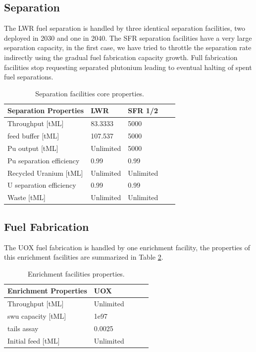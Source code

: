 \documentclass[12pt]{article}
\begin{document}
\subsection{Separation}

The LWR fuel separation is handled by three identical separation facilities,
two deployed in 2030 and one in 2040. The SFR separation facilities have a
very large separation capacity, in the first case, we have tried to throttle
the separation rate indirectly using the gradual fuel fabrication capacity
growth. Full fabrication facilities stop requesting separated plutonium
leading to eventual halting of spent fuel separations.

\begin{table}[h!]
    \centering
    \begin{tabular}{lllll}
    \hline
    Separation Properties	&	LWR		&	SFR 1/2	\\
    \hline
    Throughput [tML]		&	83.3333	&	5000		\\
    feed buffer [tML]		&	107.537	&	5000		\\
    Pu output  [tML]		&	Unlimited	&	5000		\\
    Pu separation efficiency	&	0.99		&	0.99		\\
    Recycled Uranium [tML]	&	Unlimited	&	Unlimited	\\
    U separation efficiency	&	0.99		&	0.99		\\
    Waste [tML]			&	Unlimited	&	Unlimited	\\
    \hline
    \end{tabular}
    \caption{Separation facilities core properties. }
    \label{tab:separation_1}
\end{table}

\subsection{Fuel Fabrication}

The UOX fuel fabrication is handled by one enrichment facility, the properties
of this enrichment facilities are summarized in Table \ref{tab:enrich_1}.

\begin{table}[h!]
    \centering
    \begin{tabular}{lllll}
    \hline
    Enrichment Properties	&	UOX		\\
    \hline
    Throughput [tML]		&	Unlimited	\\
    swu capacity [tML]		&	1e97		\\
    tails assay  			&	0.0025	\\
    Initial feed [tML]		&	Unlimited	\\
    \hline
    \end{tabular}
    \caption{Enrichment facilities properties. }
    \label{tab:enrich_1}
\end{table}
\end{document}
